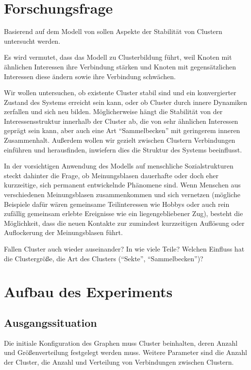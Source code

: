 \documentclass[11pt, a4paper]{scrartcl}
\begin{document}
\section{Forschungsfrage}

Basierend auf dem Modell von \autocite{Koehler-Bussmeier2018} sollen Aspekte der Stabilität von Clustern untersucht werden.

Es wird vermutet, dass das Modell zu Clusterbildung führt, weil Knoten mit ähnlichen Interessen ihre Verbindung stärken und Knoten mit gegensätzlichen Interessen diese ändern sowie ihre Verbindung schwächen.

Wir wollen untersuchen, ob existente Cluster stabil sind und ein konvergierter Zustand des Systems erreicht sein kann, oder ob Cluster durch innere Dynamiken zerfallen und sich neu bilden. Möglicherweise hängt die Stabilität von der Interessensstruktur innerhalb der Cluster ab, die von sehr ähnlichen Interessen geprägt sein kann, aber auch eine Art "`Sammelbecken"' mit geringerem inneren Zusammenhalt. Außerdem wollen wir gezielt zwischen Clustern Verbindungen einführen und herausfinden, inwiefern dies die Struktur des Systems beeinflusst.

In der vorsichtigen Anwendung des Modells auf menschliche Sozialstrukturen steckt dahinter die Frage, ob Meinungsblasen dauerhafte oder doch eher kurzzeitige, sich permanent entwickelnde Phänomene sind. Wenn Menschen aus verschiedenen Meinungsblasen zusammenkommen und sich vernetzen (mögliche Beispiele dafür wären gemeinsame Teilinteressen wie Hobbys oder auch rein zufällig gemeinsam erlebte Ereignisse wie ein liegengebliebener Zug), besteht die Möglichkeit, dass die neuen Kontakte zur zumindest kurzzeitigen Auflösung oder Auflockerung der Meinungsblasen führt.

Fallen Cluster auch wieder auseinander? In wie viele Teile? Welchen Einfluss hat die Clustergröße, die Art des Clusters ("`Sekte"', "`Sammelbecken"')?

\section{Aufbau des Experiments}
\subsection{Ausgangssituation}
Die initiale Konfiguration des Graphen muss Cluster beinhalten, deren Anzahl und Größenverteilung festgelegt werden muss. Weitere Parameter sind die Anzahl der Cluster, die Anzahl und Verteilung von Verbindungen zwischen Clustern.
\end{document}
